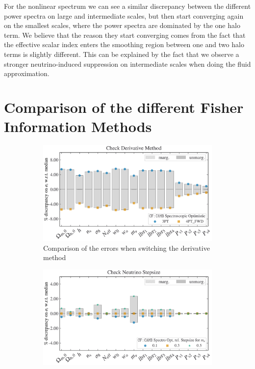 \documentclass[oneside]{book}
\newcommand*{\Euclid}{\textit{Euclid}\xspace}
\newcommand*{\cosmicfish}{\texttt{CF}\xspace}
\newcommand*{\camb}{{\tt CAMB}\xspace}
\begin{document}
 For the nonlinear spectrum we can see a similar discrepancy between the different power spectra on large and intermediate scales, but then start converging again on the smallest scales, where the power spectra are dominated by the one halo term. We believe that the reason they start converging comes from the fact that the effective scalar index enters the smoothing region between one and two halo terms is slightly different. This can be explained by the fact that we observe a stronger neutrino-induced suppression on intermediate scales when doing the fluid approximation.\\
\section{Comparison of the different Fisher Information Methods}
\begin{figure}
    \centering
    \caption{Comparisons of the one-dimensional marginalized (in light grey) and unmarginalized errors (in dark grey). The \Euclid probe is the spectroscopic probe with the optimistic settings. We use the abbreviation $lbs_i$ stands for the nuisance parameter $\ln(\hat{b}\sigma_8)_i$, where $i$ denotes the redshift bin. We plot the percentage deviation from the median error obtained by \cosmicfish:\camb. }
    \begin{subfigure}[b]{0.49\textwidth}
        \centering
        \includegraphics[width=\textwidth]{Test_Derivative_Method.pdf}
        \caption{Comparison of the errors when switching the derivative method}
        \label{fig:comparison_derivs}
    \end{subfigure}
    \hfill
    \begin{subfigure}[b]{0.49\textwidth}
        \centering
        \includegraphics[width=\textwidth]{Test_mnu_Stepsize.pdf}

\end{subfigure}
\end{figure}
\end{document}
